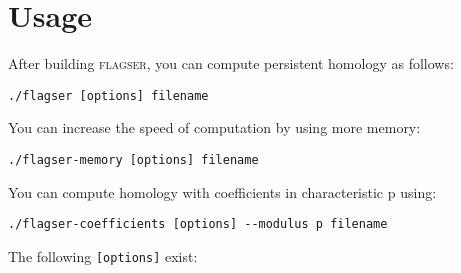 \documentclass{amsart}
\theoremstyle{definition}
\begin{document}
\section{Usage}
\noindent
After building \textsc{flagser}, you can compute persistent homology as follows:

\vspace{1em}

\begin{verbatim}./flagser [options] filename\end{verbatim}

\vspace{1em}

You can increase the speed of computation by using more memory:

\vspace{1em}

\begin{verbatim}./flagser-memory [options] filename\end{verbatim}

\vspace{1em}

You can compute homology with coefficients in characteristic p using:

\vspace{1em}

\begin{verbatim}./flagser-coefficients [options] --modulus p filename\end{verbatim}

\vspace{1em}

\noindent
The following \texttt{[options]} exist:
\end{document}
